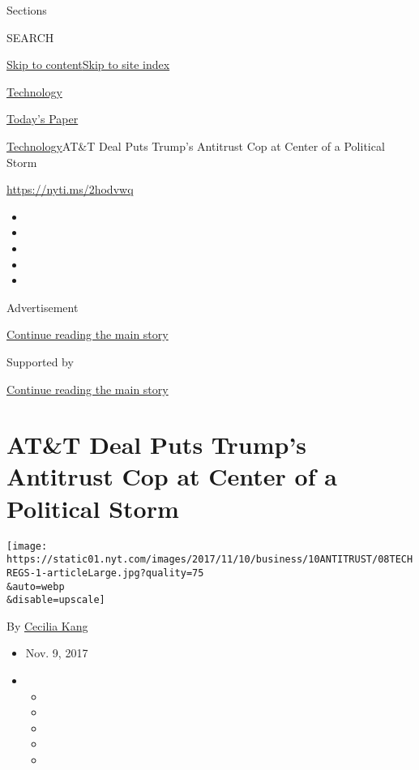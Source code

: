 Sections

SEARCH

\protect\hyperlink{site-content}{Skip to
content}\protect\hyperlink{site-index}{Skip to site index}

\href{https://www.nytimes.com/section/technology}{Technology}

\href{https://myaccount.nytimes.com/auth/login?response_type=cookie\&client_id=vi}{}

\href{https://www.nytimes.com/section/todayspaper}{Today's Paper}

\href{/section/technology}{Technology}\textbar{}AT\&T Deal Puts Trump's
Antitrust Cop at Center of a Political Storm

\url{https://nyti.ms/2hodvwq}

\begin{itemize}
\item
\item
\item
\item
\item
\end{itemize}

Advertisement

\protect\hyperlink{after-top}{Continue reading the main story}

Supported by

\protect\hyperlink{after-sponsor}{Continue reading the main story}

\hypertarget{att-deal-puts-trumps-antitrust-cop-at-center-of-a-political-storm}{%
\section{AT\&T Deal Puts Trump's Antitrust Cop at Center of a Political
Storm}\label{att-deal-puts-trumps-antitrust-cop-at-center-of-a-political-storm}}

\texttt{[image: https://static01.nyt.com/images/2017/11/10/business/10ANTITRUST/08TECHREGS-1-articleLarge.jpg?quality=75\\\&auto=webp\\\&disable=upscale]}

By \href{http://www.nytimes.com/by/cecilia-kang}{Cecilia Kang}

\begin{itemize}
\item
  Nov. 9, 2017
\item
  \begin{itemize}
  \item
  \item
  \item
  \item
  \item
  \end{itemize}
\end{itemize}

